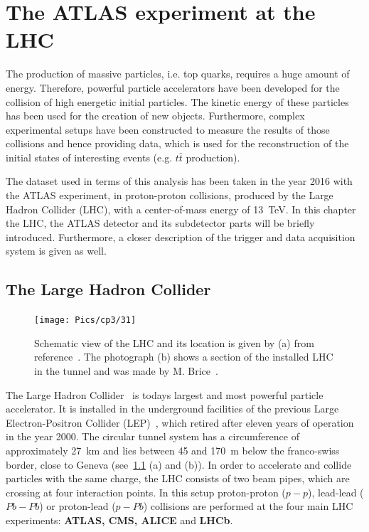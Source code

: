 \chapter{The ATLAS experiment at the LHC}\label{ch3}

The production of massive particles, i.e. top quarks, requires a huge amount of energy. 
Therefore, powerful particle accelerators have been developed for the collision of high energetic initial particles. The kinetic energy of these particles has been used for the creation of new objects. Furthermore, complex experimental setups have been constructed to measure the results of those collisions and hence providing data, which is used for the reconstruction of the initial states of interesting events (e.g. $t\bar{t}$ production).

 The dataset used in terms of this analysis has been taken in the year 2016 with the ATLAS experiment, in proton-proton collisions, produced by the Large Hadron Collider (LHC), with a center-of-mass energy of 13~TeV. In this chapter the LHC, the ATLAS detector and its subdetector parts will be briefly introduced. Furthermore, a closer description of the trigger and data acquisition system is given as well. 




\section{The Large Hadron Collider}\label{LHC}
\vspace{0.5cm}
\begin{figure}[h]
\centering
\texttt{[image: Pics/cp3/31]}
\caption{Schematic view of the LHC and its location is given by (a) from reference~\cite{Bruning:2012zz}. The photograph (b) shows a section of the installed LHC in the  tunnel and was made by M. Brice~\cite{Brice:2221112}. }
\label{fig:31}
\end{figure}

 The Large Hadron Collider~\cite{Bruning:2012zz,Bruning:2004ej,Evans:2008zzb} is todays largest and most powerful particle accelerator. It is installed in the underground facilities of the previous Large Electron-Positron Collider (LEP)~\cite{LEP}, which retired after eleven years of operation in the year 2000. The circular tunnel system has a circumference of approximately 27~km and lies between 45 and 170~m below the franco-swiss border, close to Geneva (see~\cref{fig:31} (a) and (b)). In order to accelerate and collide particles with the same charge, the LHC consists of two beam pipes, which are crossing at four interaction points. In this setup proton-proton ($p-p$), lead-lead ($Pb-Pb$) or proton-lead ($p-Pb$) collisions are performed at the four main LHC experiments: \textbf{ATLAS, CMS, ALICE} and \textbf{LHCb}.

